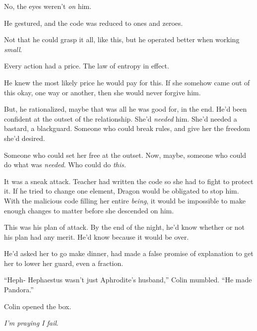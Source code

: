 No, the eyes weren't \emph{on} him.



He gestured, and the code was reduced to ones and zeroes.



Not that he could grasp it all, like this, but he operated better when working \emph{small}.



Every action had a price.  The law of entropy in effect.



He knew the most likely price he would pay for this.  If she somehow came out of this okay, one way or another, then she would never forgive him.



But, he rationalized, maybe that was all he was good for, in the end.  He'd been confident at the outset of the relationship.  She'd \emph{needed} him.  She'd needed a bastard, a blackguard.  Someone who could break rules, and give her the freedom she'd desired.



Someone who could set her free at the outset.  Now, maybe, someone who could do what was \emph{needed}.  Who could do \emph{this.}



It was a sneak attack.  Teacher had written the code so she had to fight to protect it.  If he tried to change one element, Dragon would be obligated to stop him.  With the malicious code filling her entire \emph{being}, it would be impossible to make enough changes to matter before she descended on him.



This was his plan of attack.  By the end of the night, he'd know whether or not his plan had any merit.  He'd know because it would be over.



He'd asked her to go make dinner, had made a false promise of explanation to get her to lower her guard, even a fraction.



``Heph- Hephaestus wasn't just Aphrodite's husband,'' Colin mumbled.  ``He made Pandora.''



Colin opened the box.



\emph{I'm praying I fail}.



\sectionbreak



